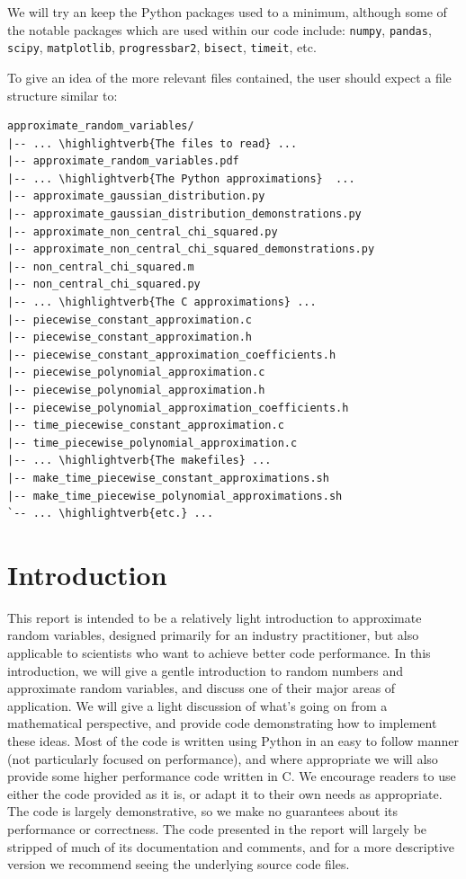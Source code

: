 \documentclass[11pt,a4paper,twoside,english]{extarticle}
\newcommand\highlightverb[1]{\underline{\textbf{#1}}}
\begin{document}
We will try an keep the Python packages used to a minimum, although some of the notable packages which are used within our code include: \texttt{numpy}, \texttt{pandas}, \texttt{scipy}, \texttt{matplotlib}, \texttt{progressbar2}, \texttt{bisect}, \texttt{timeit}, etc. 

To give an idea of the more relevant files contained, the user should expect a file structure similar to:
\begin{lstfloat}[H]
\begin{Verbatim}[commandchars=\\\{\}]
approximate_random_variables/
|-- ... \highlightverb{The files to read} ...
|-- approximate_random_variables.pdf
|-- ... \highlightverb{The Python approximations}  ...
|-- approximate_gaussian_distribution.py
|-- approximate_gaussian_distribution_demonstrations.py
|-- approximate_non_central_chi_squared.py
|-- approximate_non_central_chi_squared_demonstrations.py
|-- non_central_chi_squared.m
|-- non_central_chi_squared.py
|-- ... \highlightverb{The C approximations} ...
|-- piecewise_constant_approximation.c
|-- piecewise_constant_approximation.h
|-- piecewise_constant_approximation_coefficients.h
|-- piecewise_polynomial_approximation.c
|-- piecewise_polynomial_approximation.h
|-- piecewise_polynomial_approximation_coefficients.h
|-- time_piecewise_constant_approximation.c
|-- time_piecewise_polynomial_approximation.c
|-- ... \highlightverb{The makefiles} ...
|-- make_time_piecewise_constant_approximations.sh
|-- make_time_piecewise_polynomial_approximations.sh
`-- ... \highlightverb{etc.} ...
\end{Verbatim}
\end{lstfloat}

\clearpage
\section{Introduction}

This report is intended to be a relatively light introduction to approximate random variables, designed primarily for an industry practitioner, but also applicable to scientists who want to achieve better code performance. In this introduction, we will give a gentle introduction to random numbers and approximate random variables, and discuss one of their major areas of application. We will give a light discussion of what's going on from a mathematical perspective, and provide code demonstrating how to implement these ideas. Most of the code is written using Python in an easy to follow manner (not particularly focused on performance), and where appropriate we will also provide some higher performance code written in C. We encourage readers to use either the code provided as it is, or adapt it to their own needs as appropriate. The code is largely demonstrative, so we make no guarantees about its performance or correctness. The code presented in the report will largely be stripped of much of its documentation and comments, and for a more descriptive version we recommend seeing the underlying source code files. 
\end{document}

